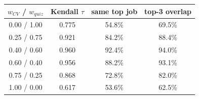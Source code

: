 \begin{tabular}{c ccc}
\hline
$w_{CV}$ / $w_{quiz}$ & Kendall $\tau$ & same top job & top-3 overlap \\
\hline
0.00 / 1.00 & 0.775 & 54.8\% & 69.5\% \\
0.25 / 0.75 & 0.921 & 84.2\% & 88.4\% \\
0.40 / 0.60 & 0.960 & 92.4\% & 94.0\% \\
0.60 / 0.40 & 0.956 & 88.2\% & 93.1\% \\
0.75 / 0.25 & 0.868 & 72.8\% & 82.0\% \\
1.00 / 0.00 & 0.617 & 53.6\% & 62.5\% \\
\hline
\end{tabular}
